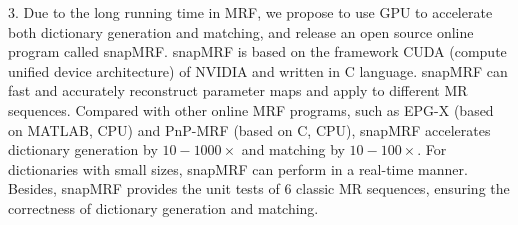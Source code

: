 \begin{englishabstract}
3. Due to the long running time in MRF, we propose to use GPU to accelerate both dictionary generation and matching, and release an open source online program called snapMRF. snapMRF is based on the framework CUDA (compute unified device architecture) of NVIDIA and written in C language. snapMRF can fast and accurately reconstruct parameter maps and apply to different MR sequences. Compared with other online MRF programs, such as EPG-X (based on MATLAB, CPU) and PnP-MRF (based on C, CPU), snapMRF accelerates dictionary generation by $10-1000\times$ and matching by $10-100\times$. For dictionaries with small sizes, snapMRF can perform in a real-time manner. Besides, snapMRF provides the unit tests of 6 classic MR sequences, ensuring the correctness of dictionary generation and matching. 


\end{englishabstract}
